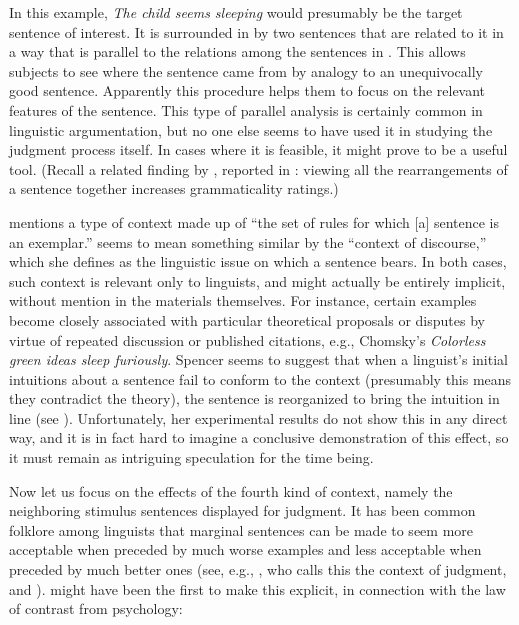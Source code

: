 \noindent
In this example, \textit{The child seems sleeping} would presumably be the target sentence of interest. It is surrounded in  by two sentences that are related to it in a way that is parallel to the relations among the sentences in . This allows subjects  to see where the sentence came from by analogy to an unequivocally  good sentence. Apparently  this procedure helps them to focus on the relevant features of the sentence. This type of parallel analysis is certainly common in linguistic argumentation,  but  no one else seems to  have  used  it in studying the judgment process itself. In cases where it is feasible, it might prove to be a useful tool. (Recall a related finding by \citet{ScottEtAl1973}, reported in : viewing all the rearrangements  of a sentence together  increases grammaticality  ratings.)

\citet{Spencer1973} mentions a type of context made up of ``the set of rules for which [a] sentence is an exemplar.'' \citet{Snow1975} seems to mean something similar by the ``context of discourse,'' which she defines as the linguistic issue on which a sentence bears. In both cases, such context is relevant only to linguists, and might actually be entirely implicit, without mention in the materials themselves. For instance, certain examples become closely associated with particular theoretical proposals or disputes by virtue of repeated discussion or published citations, e.g., Chomsky's \textit{Colorless green ideas sleep furiously}. Spencer seems to suggest that when a linguist's initial intuitions about a sentence fail to conform to the context (presumably this means they contradict the theory), the sentence is reorganized to bring the intuition in line (see ). Unfortunately, her experimental results do not show this in any direct way, and it is in fact hard to imagine a conclusive demonstration of this effect, so it must remain as intriguing speculation for the time being.

Now let us focus on the effects of the fourth kind of context, namely the neighboring stimulus sentences displayed for judgment. It has been common folklore among linguists that marginal sentences can be made to seem more acceptable when preceded by much worse examples and less acceptable when preceded by much better ones (see, e.g., \citet{Snow1975}, who calls this the context of judgment, and \citet[vol. 3]{Levelt1974}). \citet{Bever1970a,Bever1974} might have been the first to make this explicit, in connection with the law of contrast from psychology:

